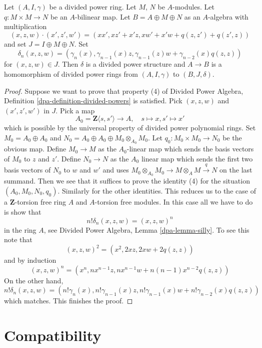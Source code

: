 \begin{lemma}
\label{lemma-divided-power-second-order-thickening}
Let $(A, I, \gamma)$ be a divided power ring. Let $M$, $N$ be $A$-modules.
Let $q : M \times M \to N$ be an $A$-bilinear map.
Let $B = A \oplus M \oplus N$ as an $A$-algebra with multiplication
$$
(x, z, w)\cdot (x', z', w') = (xx', xz' + x'z, xw' + x'w + q(z, z') + q(z', z))
$$
and set $J = I \oplus M \oplus N$. Set
$$
\delta_n(x, z, w) = (\gamma_n(x), \gamma_{n - 1}(x)z,
\gamma_{n - 1}(z)w + \gamma_{n - 2}(x)q(z, z))
$$
for $(x, z, w) \in J$.
Then $\delta$ is a divided power structure and
$A \to B$ is a homomorphism of divided power rings from
$(A, I, \gamma)$ to $(B, J, \delta)$.
\end{lemma}

\begin{proof}
Suppose we want to prove that property (4) of
Divided Power Algebra, Definition \ref{dpa-definition-divided-powers}
is satisfied. Pick $(x, z, w)$ and $(x', z', w')$ in $J$.
Pick a map
$$
A_0 = \mathbf{Z}\langle s, s'\rangle \longrightarrow A,\quad
s \longmapsto x,
s' \longmapsto x'
$$
which is possible by the universal property of divided power
polynomial rings. Set $M_0 = A_0 \oplus A_0$ and
$N_0 = A_0 \oplus A_0 \oplus M_0 \otimes_{A_0} M_0$.
Let $q_0 : M_0 \times M_0 \to N_0$ be the obvious map.
Define $M_0 \to M$ as the $A_0$-linear map which sends
the basis vectors of $M_0$ to $z$ and $z'$. Define $N_0 \to N$
as the $A_0$ linear map which sends the first two basis vectors
of $N_0$ to $w$ and $w'$ and uses
$M_0 \otimes_{A_0} M_0 \to M \otimes_A M \xrightarrow{q} N$
on the last summand. Then we see that it suffices to prove the
identity (4) for the situation $(A_0, M_0, N_0, q_0)$.
Similarly for the other identities. This reduces us to the case
of a $\mathbf{Z}$-torsion free ring $A$ and $A$-torsion free modules.
In this case all we have to do is show that
$$
n! \delta_n(x, z, w) = (x, z, w)^n
$$
in the ring $A$, see Divided Power Algebra, Lemma \ref{dpa-lemma-silly}.
To see this note that
$$
(x, z, w)^2 = (x^2, 2xz, 2xw + 2q(z, z))
$$
and by induction
$$
(x, z, w)^n = (x^n, nx^{n - 1}z, nx^{n - 1}w + n(n - 1)x^{n - 2}q(z, z))
$$
On the other hand,
$$
n! \delta_n(x, z, w) = (n!\gamma_n(x), n!\gamma_{n - 1}(x)z,
n!\gamma_{n - 1}(x)w + n!\gamma_{n - 2}(x) q(z, z))
$$
which matches. This finishes the proof.
\end{proof}




\section{Compatibility}
\label{section-compatibility}

